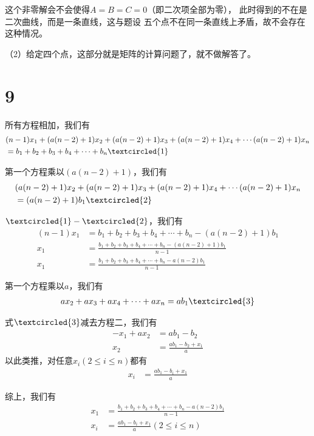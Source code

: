 \documentclass{article}
\begin{document}
这个非零解会不会使得$A=B=C=0$（即二次项全部为零），
此时得到的不在是二次曲线，而是一条直线，这与题设
五个点不在同一条直线上矛盾，故不会存在这种情况。

（2）给定四个点，这部分就是矩阵的计算问题了，就不做解答了。

\section*{9}

所有方程相加，我们有
\begin{align*}
   & (n-1)x_1 + (a(n-2) + 1)x_2 + (a(n-2) + 1)x_3 + (a(n-2) + 1)x_4 + \cdots (a(n-2) + 1)x_n \\
   & = b_1 + b_2 + b_3 + b_4 + \cdots + b_n \textcircled{1}
\end{align*}

第一个方程乘以$(a(n-2) + 1)$，我们有
\begin{align*}
   & (a(n-2) + 1)x_2 + (a(n-2) + 1)x_3 + (a(n-2) + 1)x_4 + \cdots (a(n-2) + 1)x_n \\
   & = (a(n-2) + 1)b_1 \textcircled{2}
\end{align*}

$\textcircled{1} - \textcircled{2}$，我们有
\begin{align*}
  (n-1)x_1 & = b_1 + b_2 + b_3 + b_4 + \cdots + b_n - (a(n-2) + 1)b_1               \\
  x_1      & = \frac{b_1 + b_2 + b_3 + b_4 + \cdots + b_n - (a(n-2) + 1)b_1}{n - 1} \\
  x_1      & = \frac{b_1 + b_2 + b_3 + b_4 + \cdots + b_n - a(n-2)b_1}{n - 1}
\end{align*}


第一个方程乘以$a$，我们有
\begin{align*}
  a x_2 + ax_3 + ax_4 + \cdots + ax_n = ab_1 \textcircled{3}
\end{align*}

式$\textcircled{3}$减去方程二，我们有
\begin{align*}
  -x_1 + ax_2 & = ab_1 - b_2                 \\
  x_2         & = \frac{ab_1 - b_2 + x_1}{a}
\end{align*}
以此类推，对任意$x_i(2 \leq i \leq n)$都有
\begin{align*}
  x_i & = \frac{ab_1 - b_i + x_1}{a}
\end{align*}

综上，我们有
\begin{align*}
  x_1 & = \frac{b_1 + b_2 + b_3 + b_4 + \cdots + b_n - a(n-2)b_1}{n - 1} \\
  x_i & = \frac{ab_1 - b_i + x_1}{a} (2 \leq i \leq n)
\end{align*}
\end{document}
